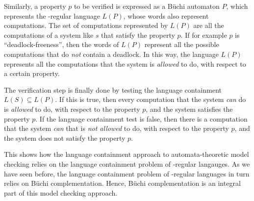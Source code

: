 Similarly, a property $p$ to be verified is expressed as a Büchi automaton $P$, which represents the \om-regular language $L(P)$, whose words also represent computations. The set of computations represented by $L(P)$ are all the computations of a system like $s$ that satisfy the property $p$. If for example $p$ is ``deadlock-freeness'', then the words of $L(P)$ represent all the possible computations that do \textit{not} contain a deadlock. In this way, the language $L(P)$ represents all the computations that the system is \textit{allowed} to do, with respect to a certain property.

The verification step is finally done by testing the language containment $L(S) \subseteq L(P)$. If this is true, then every computation that the system \textit{can} do is \textit{allowed} to do, with respect to the property $p$, and the system satisfies the property $p$. If the language containment test is false, then there is a computation that the system \textit{can} that is \textit{not allowed} to do, with respect to the property $p$, and the system does not satisfy the property $p$.

This shows how the language containment approach to automata-theoretic model checking relies on the language containment problem of \om-regular langauges. As we have seen before, the language containment problem of \om-regular languages in turn relies on Büchi complementation. Hence, Büchi complementation is an integral part of this model checking approach.




